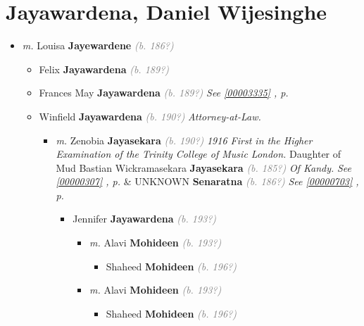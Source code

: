 \documentclass[10pt, openany]{book}
\begin{document}
\chapter{Jayawardena, Daniel Wijesinghe}
\label{00002607}
\textcolor{slmaroon}{\textit{}}
\begin{itemize}
\item{\textit{m.} Louisa \textbf{Jayewardene} \textcolor{gray}{\textit{(b. 186?)}}   \label{couple:00002607:00002608} \begin{itemize}
\item{Felix \textbf{Jayawardena} \textcolor{gray}{\textit{(b. 189?)}}
 }
\item{Frances May \textbf{Jayawardena} \textcolor{gray}{\textit{(b. 189?)}} \textcolor{slteal}{\textit{See  \autoref{00003335} \textit{, p. \pageref{00003335} }}}}
\item{Winfield \textbf{Jayawardena} \textcolor{gray}{\textit{(b. 190?)}} \textcolor{slmaroon}{\textit{Attorney-at-Law.}}
\begin{itemize}
\item{\textit{m.} Zenobia \textbf{Jayasekara} \textcolor{gray}{\textit{(b. 190?)}} \textcolor{slmaroon}{\textit{1916 First in the Higher Examination of the Trinity College of Music London.}} Daughter of  Mud Bastian Wickramasekara \textbf{Jayasekara} \textcolor{gray}{\textit{(b. 185?)}} \textcolor{slmaroon}{\textit{Of Kandy.}} \textcolor{slteal}{\textit{See  \autoref{00000307} \textit{, p. \pageref{00000307} }}}  \&  UNKNOWN \textbf{Senaratna} \textcolor{gray}{\textit{(b. 186?)}} \textcolor{slteal}{\textit{See  \autoref{00000703} \textit{, p. \pageref{00000703} }}}   \label{couple:00000322:00000360} \begin{itemize}
\item{Jennifer \textbf{Jayawardena} \textcolor{gray}{\textit{(b. 193?)}}
\begin{itemize}
\item{\textit{m.} Alavi \textbf{Mohideen} \textcolor{gray}{\textit{(b. 193?)}}   \label{couple:00002600:00003421} \begin{itemize}
\item{Shaheed  \textbf{Mohideen} \textcolor{gray}{\textit{(b. 196?)}}
 }
\end{itemize}}
\item{\textit{m.} Alavi \textbf{Mohideen} \textcolor{gray}{\textit{(b. 193?)}}   \label{couple:00002600:00002601} \begin{itemize}
\item{Shaheed \textbf{Mohideen} \textcolor{gray}{\textit{(b. 196?)}}
}
\end{itemize}}
\end{itemize}}
\end{itemize}}
\end{itemize}}
\end{itemize}}
\end{itemize}
\end{document}
